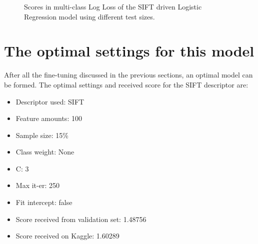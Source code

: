 \begin{figure}[H]
    \centering
    \captionsetup{width=0.65\linewidth}
    \captionsetup{justification=centering}
    \caption{Scores in multi-class Log Loss of the SIFT driven Logistic Regression model using different test sizes.}
    \label{fig:2-LBM-model_manual_c}
\end{figure}



\section{The optimal settings for this model}
\label{section:LBM_optimal}

After all the fine-tuning discussed in the previous sections, an optimal model can be formed.
The optimal settings and received score for the SIFT descriptor are:
\begin{itemize}
    \item Descriptor used: SIFT
    \item Feature amounts: 100
    \item Sample size: 15\%
    \item Class weight: None
    \item C: 3
    \item Max it-er: 250
    \item Fit intercept: false
    \item Score received from validation set: 1.48756
    \item Score received on Kaggle: 1.60289
\end{itemize}

